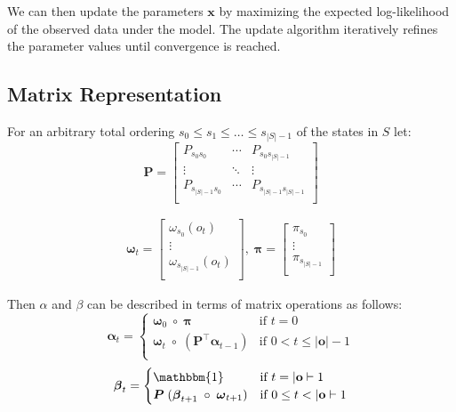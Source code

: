 We can then update the parameters $\mathbf{x}$ by maximizing the expected log-likelihood of the observed data under the model. The update algorithm iteratively refines the parameter values until convergence is reached.

\subsection{Matrix Representation}\label{subsec:matrixoperations}
For an arbitrary total ordering $s_0 \leq s_1 \leq \dots \leq s_{|S|-1}$ of the states in $S$ let:
\begin{equation}
    \boldsymbol{P} = 
    \begin{bmatrix}
        P_{s_0 s_0}             & \cdots & P_{s_0 s_{|S|-1}}             \\
        \vdots                 & \ddots & \vdots                             \\
        P_{s_{|S|-1}s_0} & \cdots & P_{s_{|S|-1}s_{|S|-1}} \\
    \end{bmatrix}
    \label{eq:equation11}
\end{equation}

\begin{eqnarray}
    \boldsymbol{\omega}_t = \begin{bmatrix}
        \omega_{s_0}(o_t)             \\
        \vdots                      \\
        \omega_{s_{|S|-1}}(o_t) \\
     \end{bmatrix}, \;
     \boldsymbol{\pi} = \begin{bmatrix}
        \pi_{s_0}             \\
        \vdots                \\
        \pi_{s_{|S|-1}} \\
    \end{bmatrix}
\end{eqnarray}

Then $\alpha$ and $\beta$ can be described in terms of matrix operations as follows:
\begin{equation}\label{eq:alpha}
    \boldsymbol{\alpha}_t =
    \begin{cases}
        \boldsymbol{\omega}_0 \; \circ \; \boldsymbol{\pi}   & \text{if } t = 0          \\ 
        \boldsymbol{\omega}_t \; \circ \; \left( \boldsymbol{P}^\top \boldsymbol{\alpha}_{t - 1} \right)   & \text{if } 0 < t \leq |\mathbf{o}|-1 \\
    \end{cases}
\end{equation}
\begin{equation}\label{eq:beta}
    \boldsymbol{\beta}_t =
    \begin{cases}
        \mathbbm{1} & \text{if } t = |\mathbf{o}|-1        \\
        \boldsymbol{P} \; (\boldsymbol{\beta}_{t + 1} \; \circ \; \boldsymbol{\omega}_{t + 1}) & \text{if } 0 \leq t < |\mathbf{o}|-1 \\
    \end{cases}
\end{equation}

